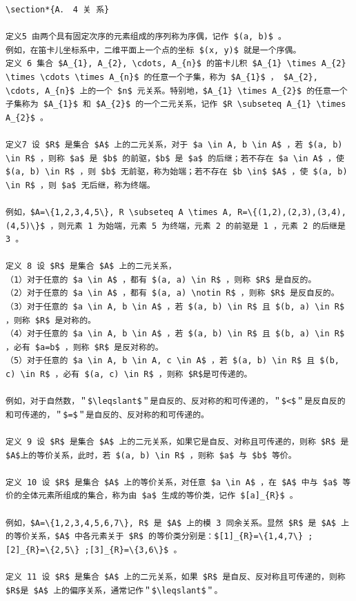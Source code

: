 \documentclass[10pt]{article}
\begin{document}
\begin{verbatim}
\section*{A． 4 关 系}

定义5 由两个具有固定次序的元素组成的序列称为序偶，记作 $(a, b)$ 。
例如，在笛卡儿坐标系中，二维平面上一个点的坐标 $(x, y)$ 就是一个序偶。
定义 6 集合 $A_{1}, A_{2}, \cdots, A_{n}$ 的笛卡儿积 $A_{1} \times A_{2} \times \cdots \times A_{n}$ 的任意一个子集，称为 $A_{1}$ ， $A_{2}, \cdots, A_{n}$ 上的一个 $n$ 元关系。特别地，$A_{1} \times A_{2}$ 的任意一个子集称为 $A_{1}$ 和 $A_{2}$ 的一个二元关系，记作 $R \subseteq A_{1} \times A_{2}$ 。

定义7 设 $R$ 是集合 $A$ 上的二元关系，对于 $a \in A, b \in A$ ，若 $(a, b) \in R$ ，则称 $a$ 是 $b$ 的前驱，$b$ 是 $a$ 的后继；若不存在 $a \in A$ ，使 $(a, b) \in R$ ，则 $b$ 无前驱，称为始端；若不存在 $b \in$ $A$ ，使 $(a, b) \in R$ ，则 $a$ 无后继，称为终端。

例如，$A=\{1,2,3,4,5\}, R \subseteq A \times A, R=\{(1,2),(2,3),(3,4),(4,5)\}$ ，则元素 1 为始端，元素 5 为终端，元素 2 的前驱是 1 ，元素 2 的后继是 3 。

定义 8 设 $R$ 是集合 $A$ 上的二元关系，
（1）对于任意的 $a \in A$ ，都有 $(a, a) \in R$ ，则称 $R$ 是自反的。
（2）对于任意的 $a \in A$ ，都有 $(a, a) \notin R$ ，则称 $R$ 是反自反的。
（3）对于任意的 $a \in A, b \in A$ ，若 $(a, b) \in R$ 且 $(b, a) \in R$ ，则称 $R$ 是对称的。
（4）对于任意的 $a \in A, b \in A$ ，若 $(a, b) \in R$ 且 $(b, a) \in R$ ，必有 $a=b$ ，则称 $R$ 是反对称的。
（5）对于任意的 $a \in A, b \in A, c \in A$ ，若 $(a, b) \in R$ 且 $(b, c) \in R$ ，必有 $(a, c) \in R$ ，则称 $R$是可传递的。

例如，对于自然数，＂$\leqslant$＂是自反的、反对称的和可传递的，＂$<$＂是反自反的和可传递的，＂$=$＂是自反的、反对称的和可传递的。

定义 9 设 $R$ 是集合 $A$ 上的二元关系，如果它是自反、对称且可传递的，则称 $R$ 是 $A$上的等价关系，此时，若 $(a, b) \in R$ ，则称 $a$ 与 $b$ 等价。

定义 10 设 $R$ 是集合 $A$ 上的等价关系，对任意 $a \in A$ ，在 $A$ 中与 $a$ 等价的全体元素所组成的集合，称为由 $a$ 生成的等价类，记作 $[a]_{R}$ 。

例如，$A=\{1,2,3,4,5,6,7\}, R$ 是 $A$ 上的模 3 同余关系。显然 $R$ 是 $A$ 上的等价关系，$A$ 中各元素关于 $R$ 的等价类分别是：$[1]_{R}=\{1,4,7\} ;[2]_{R}=\{2,5\} ;[3]_{R}=\{3,6\}$ 。

定义 11 设 $R$ 是集合 $A$ 上的二元关系，如果 $R$ 是自反、反对称且可传递的，则称 $R$是 $A$ 上的偏序关系，通常记作＂$\leqslant$＂。


\end{verbatim}
\end{document}
